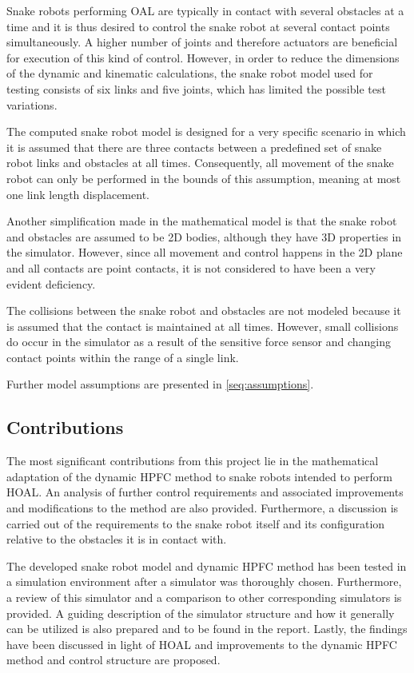 Snake robots performing OAL are typically in contact with several obstacles at a time and it is thus desired to control the snake robot at several contact points simultaneously. A higher number of joints and therefore actuators are beneficial for execution of this kind of control. However, in order to reduce the dimensions of the dynamic and kinematic calculations, the snake robot model used for testing consists of six links and five joints, which has limited the possible test variations.

The computed snake robot model is designed for a very specific scenario in which it is assumed that there are three contacts between a predefined set of snake robot links and obstacles at all times. Consequently, all movement of the snake robot can only be performed in the bounds of this assumption, meaning at most one link length displacement.

Another simplification made in the mathematical model is that the snake robot and obstacles are assumed to be 2D bodies, although they have 3D properties in the simulator. However, since all movement and control happens in the 2D plane and all contacts are point contacts, it is not considered to have been a very evident deficiency.

The collisions between the snake robot and obstacles are not modeled because it is assumed that the contact is maintained at all times. However, small collisions do occur in the simulator as a result of the sensitive force sensor and changing contact points within the range of a single link.

Further model assumptions are presented in \ref{seq:assumptions}.

\subsection{Contributions}

The most significant contributions from this project lie in the mathematical adaptation of the dynamic HPFC method to snake robots intended to perform HOAL. An analysis of further control requirements and associated improvements and modifications to the method are also provided. Furthermore, a discussion is carried out of the requirements to the snake robot itself and its configuration relative to the obstacles it is in contact with.

The developed snake robot model and dynamic HPFC method has been tested in a simulation environment after a simulator was thoroughly chosen. Furthermore, a review of this simulator and a comparison to other corresponding simulators is provided. A guiding description of the simulator structure and how it generally can be utilized is also prepared and to be found in the report. Lastly, the findings have been discussed in light of HOAL and improvements to the dynamic HPFC method and control structure are proposed.



